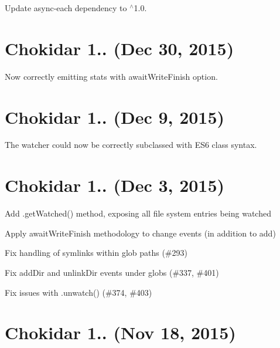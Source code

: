 \begin{DoxyItemize}
\item Update async-\/each dependency to $^\wedge$1.0.
\end{DoxyItemize}

\section*{Chokidar 1.. (Dec 30, 2015)}


\begin{DoxyItemize}
\item Now correctly emitting {\ttfamily stats} with {\ttfamily await\+Write\+Finish} option.
\end{DoxyItemize}

\section*{Chokidar 1.. (Dec 9, 2015)}


\begin{DoxyItemize}
\item The watcher could now be correctly subclassed with E\+S6 class syntax.
\end{DoxyItemize}

\section*{Chokidar 1.. (Dec 3, 2015)}


\begin{DoxyItemize}
\item Add {\ttfamily .get\+Watched()} method, exposing all file system entries being watched
\item Apply {\ttfamily await\+Write\+Finish} methodology to {\ttfamily change} events (in addition to {\ttfamily add})
\item Fix handling of symlinks within glob paths (\#293)
\item Fix {\ttfamily add\+Dir} and {\ttfamily unlink\+Dir} events under globs (\#337, \#401)
\item Fix issues with {\ttfamily .unwatch()} (\#374, \#403)
\end{DoxyItemize}

\section*{Chokidar 1.. (Nov 18, 2015)}


